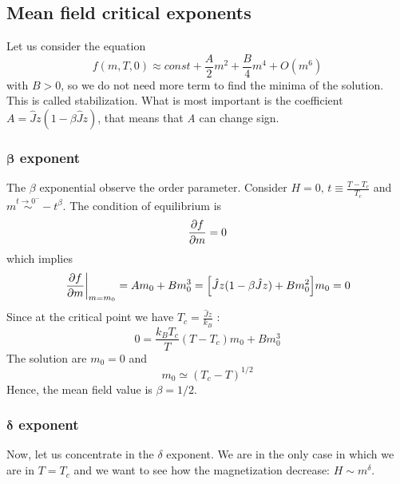 \documentclass[../../Main/Main.tex]{subfiles}
\begin{document}
\subsection{Mean field critical exponents}

Let us consider the equation
\begin{equation*}
  f (m,T,0) \approx const + \frac{A}{2} m^2 + \frac{B}{4} m^4 + O(m^6)
\end{equation*}
with \( B>0 \), so we do not need more term to find the minima of the solution. This is called stabilization. What is most important is  the coefficient \( A = \hat{J} z (1- \beta \hat{J} z ) \), that means that  \emph{A} can change sign.

\subsubsection{\( \pmb{\beta}  \) exponent}
The \( \beta  \) exponential observe the order parameter. Consider \( H=0,\, t \equiv \frac{T-T_c}{T_c} \) and \( m \overset{t \rightarrow 0^-}{\sim } -t^ \beta  \). The condition of equilibrium is
\begin{equation*}
  \pdv{f}{m}=0
\end{equation*}
which implies
\begin{equation*}
  \eval{\pdv{f}{m} }_{m=m_0} = A m_0 + B m_0^3 = \qty[ \hat{J} z ( 1- \beta \hat{J} z ) + B m_0^2]m_0 = 0
\end{equation*}
Since at the critical point we have \( T_c = \frac{\hat{J}z }{k_B } \) :
\begin{equation*}
  0 = \frac{k_B T_c}{T} (T-T_c) m_0 + B m_0^3
\end{equation*}
The solution are \( m_0=0 \) and
\begin{equation}
  m_0 \simeq (T_c-T)^{1/2}
\end{equation}
Hence, the mean field value is \( \beta =1/2 \).

\subsubsection{\( \pmb{\delta}  \) exponent}
Now, let us concentrate in the \( \delta  \) exponent. We are in the only case in which we are in \( T = T_c \) and we want to see how the magnetization decrease: \(  H \sim m^ \delta \).
\end{document}
